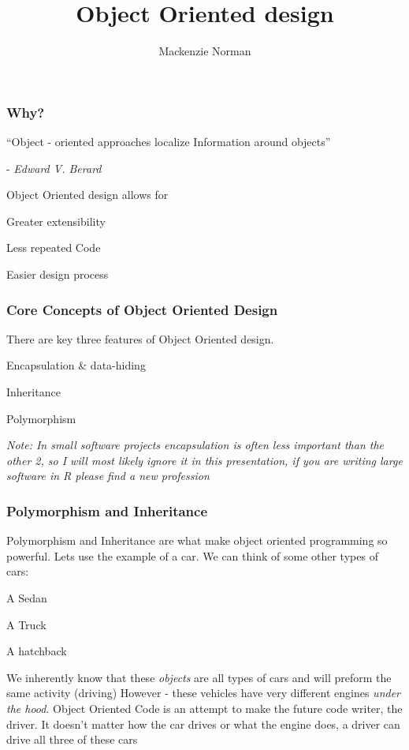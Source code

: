 \documentclass{beamer}
\title{Object Oriented design }
\author{Mackenzie Norman}
\begin{document}
\frame{\titlepage}

\begin{frame}
\frametitle{Why?}
``Object - oriented approaches localize Information around objects''

        - \textit{Edward V. Berard}\newline

Object Oriented design allows for
\begin{list}{- }{}
    \item Greater extensibility
    
    \item Less repeated Code
    \item Easier design process
\end{list}

\end{frame}

\begin{frame}
\frametitle{Core Concepts of Object Oriented Design}
There are key three features of Object Oriented design. 

\begin{list}{- }{}
    \item Encapsulation \& data-hiding
    \item Inheritance
    \item Polymorphism 
\end{list}

\textit{Note: In small software projects encapsulation is often less important than the other 2, so I will most likely ignore it in this presentation, if you are writing large software in R please find a new profession}

\end{frame}


\begin{frame}
    \frametitle{Polymorphism and Inheritance}
    Polymorphism and Inheritance are what make object oriented programming so powerful. Lets use the example of a car. We can think of some other types of cars:
\begin{list}{- }{}
    \item A Sedan
    \item A Truck
    \item A hatchback
\end{list}

We inherently know that these \textit{objects} are all types of cars and will preform the same activity (driving)
However - these vehicles have very different engines \textit{under the hood}. 
Object Oriented Code is an attempt to make the future code writer,  the driver. It doesn't matter how the car drives or what the engine does, a driver can drive all three of these cars

\end{frame}
\end{document}

